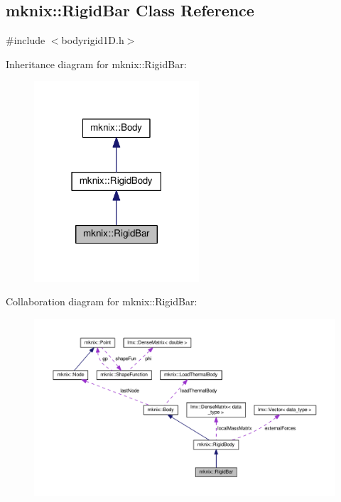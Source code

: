 \hypertarget{classmknix_1_1_rigid_bar}{}\subsection{mknix\+:\+:Rigid\+Bar Class Reference}
\label{classmknix_1_1_rigid_bar}


{\ttfamily \#include $<$bodyrigid1\+D.\+h$>$}



Inheritance diagram for mknix\+:\+:Rigid\+Bar\+:\nopagebreak
\begin{figure}[H]
\begin{center}
\leavevmode
\includegraphics[width=174pt]{da/d1e/classmknix_1_1_rigid_bar__inherit__graph}
\end{center}
\end{figure}


Collaboration diagram for mknix\+:\+:Rigid\+Bar\+:\nopagebreak
\begin{figure}[H]
\begin{center}
\leavevmode
\includegraphics[width=350pt]{d7/df8/classmknix_1_1_rigid_bar__coll__graph}
\end{center}
\end{figure}
